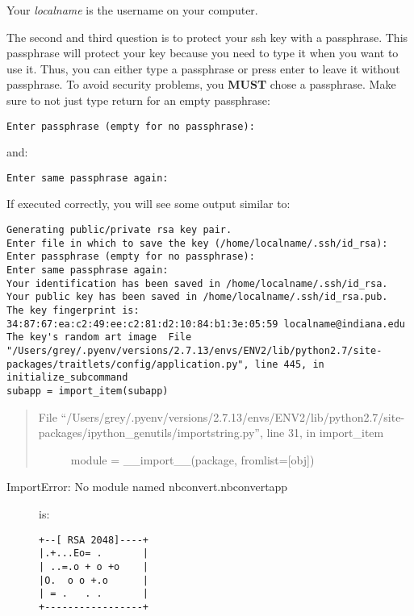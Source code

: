 Your \emph{localname} is the username on your computer.

The second and third question is to protect your ssh key with a
passphrase. This passphrase will protect your key because you need to
type it when you want to use it. Thus, you can either type a passphrase
or press enter to leave it without passphrase. To avoid security
problems, you \textbf{MUST} chose a passphrase. Make sure to not just
type return for an empty passphrase:

\begin{verbatim}
Enter passphrase (empty for no passphrase):
\end{verbatim}

and:

\begin{verbatim}
Enter same passphrase again:
\end{verbatim}

If executed correctly, you will see some output similar to:

\begin{verbatim}
Generating public/private rsa key pair.
Enter file in which to save the key (/home/localname/.ssh/id_rsa): 
Enter passphrase (empty for no passphrase):
Enter same passphrase again:
Your identification has been saved in /home/localname/.ssh/id_rsa.
Your public key has been saved in /home/localname/.ssh/id_rsa.pub.
The key fingerprint is:
34:87:67:ea:c2:49:ee:c2:81:d2:10:84:b1:3e:05:59 localname@indiana.edu
The key's random art image  File "/Users/grey/.pyenv/versions/2.7.13/envs/ENV2/lib/python2.7/site-packages/traitlets/config/application.py", line 445, in initialize_subcommand
subapp = import_item(subapp)
\end{verbatim}

\begin{quote}
\begin{description}
\item[File
``/Users/grey/.pyenv/versions/2.7.13/envs/ENV2/lib/python2.7/site-packages/ipython\_genutils/importstring.py'',
line 31, in import\_item]
module = \_\_import\_\_(package, fromlist={[}obj{]})
\end{description}
\end{quote}

\begin{description}
\item[ImportError: No module named nbconvert.nbconvertapp]
is:

\begin{verbatim}
+--[ RSA 2048]----+
|.+...Eo= .       |
| ..=.o + o +o    |
|O.  o o +.o      |
| = .   . .       |
+-----------------+
\end{verbatim}
\end{description}

